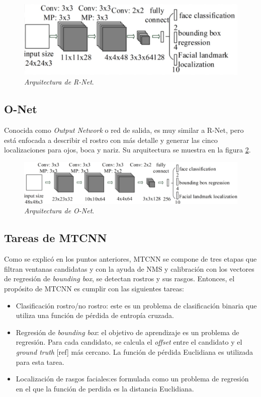 \begin{figure}[h]
	\centering
	\includegraphics[scale=0.25]{./Figures/mtcnn_rnet.png}
	\caption{\textit{Arquitectura de R-Net}.}
	\label{fig:mtcnn_rnet}
\end{figure}

\subsection{O-Net}
Conocida como \textit{Output Network} o red de salida, es muy similar a R-Net, pero está enfocada a describir el rostro con más detalle y generar las cinco localizaciones para ojos, boca y nariz. Su arquitectura se muestra en la figura \ref{fig:mtcnn_onet}.

\begin{figure}[h]
	\centering
	\includegraphics[scale=0.3]{./Figures/mtcnn_onet.png}
	\caption{\textit{Arquitectura de O-Net}.}
	\label{fig:mtcnn_onet}
\end{figure}

\subsection{Tareas de MTCNN}
Como se explicó en los puntos anteriores, MTCNN se compone de tres etapas que filtran ventanas candidatas y con la ayuda de NMS y calibración con los vectores de regresión de \textit{bounding box}, se detectan rostros y sus rasgos. Entonces, el propósito de MTCNN es cumplir con las siguientes tareas:
\begin{itemize}
	\item Clasificación rostro/no rostro: este es un problema de clasificación binaria que utiliza una función de pérdida de entropía cruzada.
	\item Regresión de \textit{bounding box}: el objetivo de aprendizaje es un problema de regresión. Para cada candidato, se calcula el \textit{offset} entre el candidato y el \textit{ground truth} [ref] más cercano. La función de pérdida Euclidiana es utilizada para esta tarea.
	\item Localización de rasgos faciales:es formulada como un problema de regresión en el que la función de perdida es la distancia Euclidiana.
\end{itemize}

